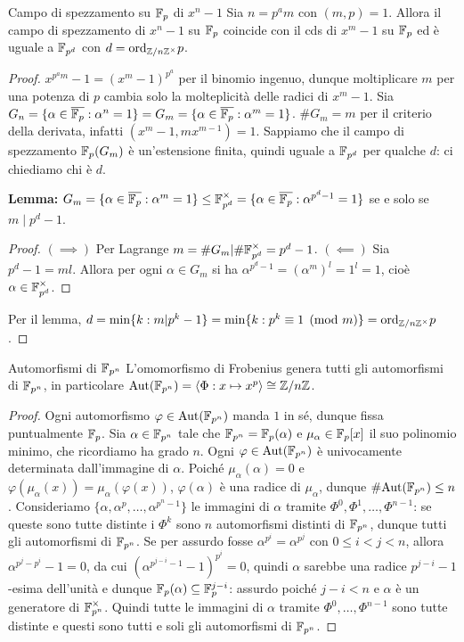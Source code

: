 \begin{theorem}{Campo di spezzamento su $\mathbb{F}_p$ di $x^n - 1$}
    Sia $n = p^a m$ con $(m, p) = 1$. Allora il campo di spezzamento di $x^n - 1$ su $\mathbb{F}_p$ coincide con il cds di $x^m - 1$ su $\mathbb{F}_p$ ed è uguale a $\mathbb{F}_{p^d}$ con $d = \text{ord}_{\mathbb{Z}/n\mathbb{Z}^\times}p$.
\end{theorem}
\begin{proof}
    $x^{p^a m} - 1 = (x^m - 1)^{p^a}$ per il binomio ingenuo, dunque moltiplicare $m$ per una potenza di $p$ cambia solo la molteplicità delle radici di $x^m - 1$. Sia $G_n = \{ \alpha \in \overline{\mathbb{F}_p} : \alpha^n = 1 \} = G_m = \{ \alpha \in \overline{\mathbb{F}_p} : \alpha^m = 1 \}$. $\# G_m = m$ per il criterio della derivata, infatti $(x^m - 1, mx^{m-1}) = 1$. Sappiamo che il campo di spezzamento $\mathbb{F}_p(G_m)$ è un'estensione finita, quindi uguale a $\mathbb{F}_{p^d}$ per qualche $d$: ci chiediamo chi è $d$.

    \textbf{Lemma:} $G_m = \{ \alpha \in \overline{\mathbb{F}_p} : \alpha^m = 1 \} \le \mathbb{F}_{p^d}^\times = \{ \alpha \in \overline{\mathbb{F}_p} : \alpha^{p^d - 1} = 1 \}$ se e solo se $m \mid p^d - 1$.
    \begin{proof}
        $(\implies)$ Per Lagrange $m = \#G_m | \#\mathbb{F}_{p^d}^\times = p^d - 1$.
        $(\impliedby)$ Sia $p^d - 1 = m l$. Allora per ogni $\alpha \in G_m$ si ha $\alpha^{p^d - 1} = (\alpha^m)^l = 1^l = 1$, cioè $\alpha \in \mathbb{F}_{p^d}^\times$.
    \end{proof}
    
    Per il lemma, $d = \min \{ k : m | p^k - 1 \} = \min \{ k : p^k \equiv 1 \pmod{m} \} = \text{ord}_{\mathbb{Z}/n\mathbb{Z}^\times}p$.
\end{proof}

\begin{theorem}{Automorfismi di $\mathbb{F}_{p^n}$}
    L'omomorfismo di Frobenius genera tutti gli automorfismi di $\mathbb{F}_{p^n}$, in particolare $\text{Aut}(\mathbb{F}_{p^n}) = \langle \Phi: x \mapsto x^p \rangle \cong \mathbb{Z}/n\mathbb{Z}$.
\end{theorem}
\begin{proof}
    Ogni automorfismo $\varphi \in \text{Aut}(\mathbb{F}_{p^n})$ manda $1$ in sé, dunque fissa puntualmente $\mathbb{F}_p$. Sia $\alpha \in \mathbb{F}_{p^n}$ tale che $\mathbb{F}_{p^n} = \mathbb{F}_p(\alpha)$ e $\mu_\alpha \in \mathbb{F}_p[x]$ il suo polinomio minimo, che ricordiamo ha grado $n$. Ogni $\varphi \in \text{Aut}(\mathbb{F}_{p^n})$ è univocamente determinata dall'immagine di $\alpha$. Poiché $\mu_\alpha(\alpha) = 0$ e $\varphi(\mu_\alpha(x)) = \mu_\alpha(\varphi(x))$, $\varphi(\alpha)$ è una radice di $\mu_\alpha$, dunque $\#\text{Aut}(\mathbb{F}_{p^n}) \le n$. Consideriamo $\{ \alpha, \alpha^p, \dots, \alpha^{p^n - 1} \}$ le immagini di $\alpha$ tramite $\Phi^0, \Phi^1, \dots, \Phi^{n - 1}$: se queste sono tutte distinte i $\Phi^k$ sono $n$ automorfismi distinti di $\mathbb{F}_{p^n}$, dunque tutti gli automorfismi di $\mathbb{F}_{p^n}$. Se per assurdo fosse $\alpha^{p^i} = \alpha^{p^j}$ con $0 \le i < j < n$, allora $\alpha^{p^j - p^i} - 1 = 0$, da cui $(\alpha^{p^{j - i} - 1} - 1)^{p^i} = 0$, quindi $\alpha$ sarebbe una radice $p^{j-i} - 1$-esima dell'unità e dunque $\mathbb{F}_p(\alpha) \subseteq \mathbb{F}_p^{j - i}$: assurdo poiché $j - i < n$ e $\alpha$ è un generatore di $\mathbb{F}_{p^n}^\times$. Quindi tutte le immagini di $\alpha$ tramite $\Phi^0, \dots, \Phi^{n-1}$ sono tutte distinte e questi sono tutti e soli gli automorfismi di $\mathbb{F}_{p^n}$.
\end{proof}

